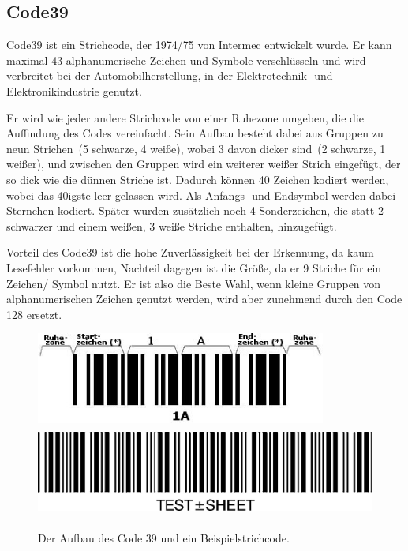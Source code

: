 \subsection*{Code39}
Code39 ist ein Strichcode, der 1974/75 von Intermec entwickelt wurde. Er kann max\-imal 43 alphanumerische Zeichen und Symbole verschlüsseln und wird verbreitet bei der Automobilherstellung, in der Elektrotechnik- und Elektronikindustrie genutzt.

Er wird wie jeder andere Strichcode von einer Ruhezone umgeben, die die Auffindung des Codes vereinfacht. Sein Aufbau besteht dabei aus Gruppen zu neun Strichen~(5 schwarze, 4 weiße), wobei 3 davon dicker sind~(2 schwarze, 1 weißer), und zwischen den Gruppen wird ein weiterer weißer Strich eingefügt, der so dick wie die dünnen Striche ist. Dadurch können 40 Zeichen kodiert werden, wobei das 40igste leer gelassen wird. Als Anfangs- und Endsymbol werden dabei Sternchen kodiert. Später wurden zusätzlich noch 4 Sonderzeichen, die statt 2 schwarzer und einem weißen, 3 weiße Striche enthalten, hinzugefügt.

Vorteil des Code39 ist die hohe Zuverlässigkeit bei der Erkennung, da kaum Lesefehler vorkommen, Nachteil dagegen ist die Größe, da er 9 Striche für ein Zeichen/ Symbol nutzt. Er ist also die Beste Wahl, wenn kleine Gruppen von alphanumerischen Zeichen genutzt werden, wird aber zunehmend durch den Code 128 ersetzt.~\cite{Allais2006}

\begin{figure}[H]
  \centering
  \includegraphics[height=3cm]{img/EAN13/code39-structure.jpg}
  \includegraphics[height=3cm]{img/EAN13/code39.jpg}
  \caption{Der Aufbau des Code 39 und ein Beispielstrichcode.}
  \label{fig:code39}
\end{figure}
